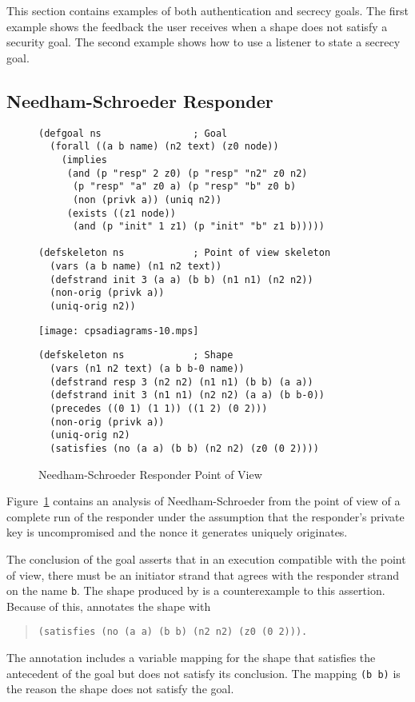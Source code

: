\documentclass[12pt]{article}
\begin{document}
This section contains examples of both authentication and secrecy
goals.  The first example shows the feedback the user receives when a
shape does not satisfy a security goal.  The second example shows how
to use a listener to state a secrecy goal.

\subsection{Needham-Schroeder Responder}\label{sec:ns resp}

\begin{figure}
\begin{verbatim}
(defgoal ns                ; Goal
  (forall ((a b name) (n2 text) (z0 node))
    (implies
     (and (p "resp" 2 z0) (p "resp" "n2" z0 n2)
      (p "resp" "a" z0 a) (p "resp" "b" z0 b)
      (non (privk a)) (uniq n2))
     (exists ((z1 node))
      (and (p "init" 1 z1) (p "init" "b" z1 b)))))

(defskeleton ns            ; Point of view skeleton
  (vars (a b name) (n1 n2 text))
  (defstrand init 3 (a a) (b b) (n1 n1) (n2 n2))
  (non-orig (privk a))
  (uniq-orig n2))
\end{verbatim}
\begin{center}
\texttt{[image: cpsadiagrams-10.mps]}
\end{center}
\begin{verbatim}
(defskeleton ns            ; Shape
  (vars (n1 n2 text) (a b b-0 name))
  (defstrand resp 3 (n2 n2) (n1 n1) (b b) (a a))
  (defstrand init 3 (n1 n1) (n2 n2) (a a) (b b-0))
  (precedes ((0 1) (1 1)) ((1 2) (0 2)))
  (non-orig (privk a))
  (uniq-orig n2)
  (satisfies (no (a a) (b b) (n2 n2) (z0 (0 2))))
\end{verbatim}
\caption{Needham-Schroeder Responder Point of View}
\label{fig:ns resp}
\end{figure}

Figure~\ref{fig:ns resp} contains an analysis of Needham-Schroeder
from the point of view of a complete run of the responder under the
assumption that the responder's private key is uncompromised and the
nonce it generates uniquely originates.

The conclusion of the goal asserts that in an execution compatible
with the point of view, there must be an initiator strand that agrees
with the responder strand on the name \texttt{b}.  The shape produced
by {\cpsa} is a counterexample to this assertion.  Because of this,
{\cpsa} annotates the shape with
\begin{quote}
\begin{verbatim}
(satisfies (no (a a) (b b) (n2 n2) (z0 (0 2))).
\end{verbatim}
\end{quote}
The annotation includes a variable mapping for the shape that
satisfies the antecedent of the goal but does not satisfy its
conclusion.  The mapping \texttt{(b b)} is the reason the shape does
not satisfy the goal.
\end{document}

